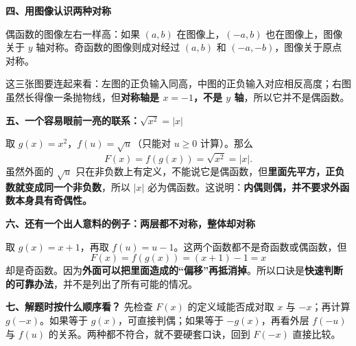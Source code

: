\clearpage
\begin{explanationbox}
\textbf{\textcolor{CExplanation}{四、用图像认识两种对称}}


偶函数的图像左右一样高：如果 $(a,b)$ 在图像上，$(-a,b)$ 也在图像上，图像关于 $y$ 轴对称。奇函数的图像则成对经过 $(a,b)$ 和 $(-a,-b)$，图像关于原点对称。


这三张图要连起来看：左图的正负输入同高，中图的正负输入对应相反高度；右图虽然长得像一条抛物线，但\textbf{对称轴是 $x=-1$，不是 $y$ 轴}，所以它并不是偶函数。

\medskip

\end{explanationbox}
\clearpage
\begin{explanationbox}
\textbf{\textcolor{CExplanation}{五、一个容易眼前一亮的联系：$\sqrt{x^2}=|x|$}}


取 $g(x)=x^2$，$f(u)=\sqrt{u}$（只能对 $u\geqslant0$ 计算）。那么
\[
F(x)=f(g(x))=\sqrt{x^2}=|x|.
\]
虽然外面的 $\sqrt{u}$ 只在非负数上有定义，不能说它是偶函数，但\textbf{里面先平方，正负数就变成同一个非负数}，所以 $|x|$ 必为偶函数。这说明：\textbf{内偶则偶，并不要求外函数本身具有奇偶性。}

\medskip

\end{explanationbox}
\clearpage
\begin{explanationbox}
\textbf{\textcolor{CExplanation}{六、还有一个出人意料的例子：两层都不对称，整体却对称}}


取 $g(x)=x+1$，再取 $f(u)=u-1$。这两个函数都不是奇函数或偶函数，但
\[
F(x)=f(g(x))=(x+1)-1=x
\]
却是奇函数。因为\textbf{外面可以把里面造成的“偏移”再抵消掉}。所以口诀是\textbf{快速判断的可靠办法}，并不是列出了所有可能的情况。

\medskip

\textbf{\textcolor{CExplanation}{七、解题时按什么顺序看？}}
先检查 $F(x)$ 的定义域能否成对取 $x$ 与 $-x$；再计算 $g(-x)$。如果等于 $g(x)$，可直接判偶；如果等于 $-g(x)$，再看外层 $f(-u)$ 与 $f(u)$ 的关系。两种都不符合，就不要硬套口诀，回到 $F(-x)$ 直接比较。
\end{explanationbox}
